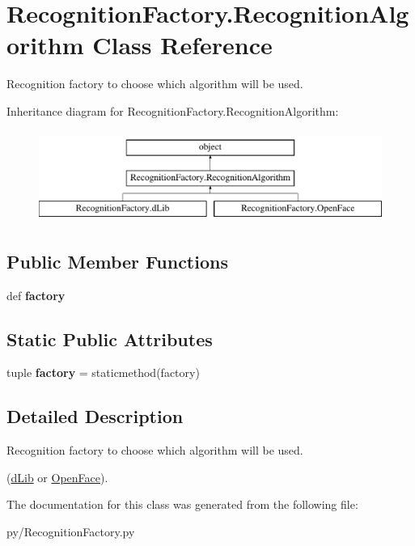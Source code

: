 \hypertarget{classRecognitionFactory_1_1RecognitionAlgorithm}{\section{Recognition\-Factory.\-Recognition\-Algorithm Class Reference}
\label{classRecognitionFactory_1_1RecognitionAlgorithm}
}


Recognition factory to choose which algorithm will be used.  


Inheritance diagram for Recognition\-Factory.\-Recognition\-Algorithm\-:\begin{figure}[H]
\begin{center}
\leavevmode
\includegraphics[height=3.000000cm]{classRecognitionFactory_1_1RecognitionAlgorithm}
\end{center}
\end{figure}
\subsection*{Public Member Functions}
\begin{DoxyCompactItemize}
\item 
\hypertarget{classRecognitionFactory_1_1RecognitionAlgorithm_acc15c6c8c13e74e4fa5848141b3a98bb}{def {\bfseries factory}}\label{classRecognitionFactory_1_1RecognitionAlgorithm_acc15c6c8c13e74e4fa5848141b3a98bb}

\end{DoxyCompactItemize}
\subsection*{Static Public Attributes}
\begin{DoxyCompactItemize}
\item 
\hypertarget{classRecognitionFactory_1_1RecognitionAlgorithm_a9d948cf769252cf8bdc07639332203d3}{tuple {\bfseries factory} = staticmethod(factory)}\label{classRecognitionFactory_1_1RecognitionAlgorithm_a9d948cf769252cf8bdc07639332203d3}

\end{DoxyCompactItemize}


\subsection{Detailed Description}
Recognition factory to choose which algorithm will be used. 

(\hyperlink{classRecognitionFactory_1_1dLib}{d\-Lib} or \hyperlink{classRecognitionFactory_1_1OpenFace}{Open\-Face}). 

The documentation for this class was generated from the following file\-:\begin{DoxyCompactItemize}
\item 
py/Recognition\-Factory.\-py\end{DoxyCompactItemize}
